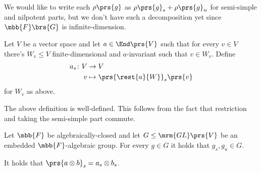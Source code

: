 \documentclass[10pt,a4paper,twoside,openany,hidelinks]{book}
\begin{document}
We would like to write each $\rho\prs{g}$ as $\rho\prs{g}_s + \rho\prs{g}_n$ for semi-simple and nilpotent parts, but we don't have such a decomposition yet since $\mbb{F}\brs{G}$ is infinite-dimension.

\begin{definition}
Let $V$ be a vector space and let $a \in \End\prs{V}$ such that for every $v \in V$ there's $W_v \leq V$ finite-dimensional and $a$-invariant such that $v \in W_v$.
Define
\begin{align*}
a_s \colon V &\to V \\
v &\mapsto \prs{\rest{a}{W}}_s \prs{v}
\end{align*}
for $W_v$ as above.
\end{definition}

\begin{exercise}
The above definition is well-defined. This follows from the fact that restriction and taking the semi-simple part commute.
\end{exercise}

\begin{theorem} \label{theorem:jordan_chevalley_groups}
Let $\mbb{F}$ be algebraically-closed and let $G \leq \mrm{GL}\prs{V}$ be an embedded $\mbb{F}$-algebraic group. For every $g \in G$ it holds that $g_s, g_u \in G$.
\end{theorem}

\begin{exercise}
It holds that $\prs{a \otimes b}_s = a_s \otimes b_s$.
\end{exercise}
\end{document}
